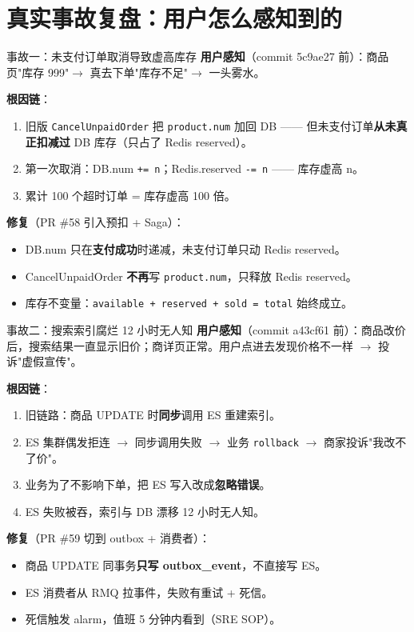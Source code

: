 \documentclass[aspectratio=169,11pt]{beamer}
\begin{document}
\section{真实事故复盘：用户怎么感知到的}

\begin{frame}[shrink]{事故一：未支付订单取消导致虚高库存}
\textbf{用户感知}（commit 5c9ae27 前）：商品页"库存 999"$\to$ 真去下单"库存不足"$\to$ 一头雾水。

\vspace{2mm}
\textbf{根因链}：
\begin{enumerate}
  \item 旧版 \texttt{CancelUnpaidOrder} 把 \texttt{product.num} 加回 DB —— 但未支付订单\textbf{从未真正扣减过} DB 库存（只占了 Redis reserved）。
  \item 第一次取消：DB.num \texttt{+= n}；Redis.reserved \texttt{-= n} —— 库存虚高 n。
  \item 累计 100 个超时订单 = 库存虚高 100 倍。
\end{enumerate}
\vspace{1mm}
\textbf{修复}（PR \#58 引入预扣 + Saga）：
\begin{itemize}
  \item DB.num 只在\textbf{支付成功}时递减，未支付订单只动 Redis reserved。
  \item CancelUnpaidOrder \textbf{不再}写 \texttt{product.num}，只释放 Redis reserved。
  \item 库存不变量：\texttt{available + reserved + sold = total} 始终成立。
\end{itemize}
\end{frame}

\begin{frame}[shrink]{事故二：搜索索引腐烂 12 小时无人知}
\textbf{用户感知}（commit a43cf61 前）：商品改价后，搜索结果一直显示旧价；商详页正常。用户点进去发现价格不一样 $\to$ 投诉"虚假宣传"。

\vspace{2mm}
\textbf{根因链}：
\begin{enumerate}
  \item 旧链路：商品 UPDATE 时\textbf{同步}调用 ES 重建索引。
  \item ES 集群偶发拒连 $\to$ 同步调用失败 $\to$ 业务 \texttt{rollback} $\to$ 商家投诉"我改不了价"。
  \item 业务为了不影响下单，把 ES 写入改成\textbf{忽略错误}。
  \item ES 失败被吞，索引与 DB 漂移 12 小时无人知。
\end{enumerate}
\vspace{1mm}
\textbf{修复}（PR \#59 切到 outbox + 消费者）：
\begin{itemize}
  \item 商品 UPDATE 同事务\textbf{只写 outbox\_event}，不直接写 ES。
  \item ES 消费者从 RMQ 拉事件，失败有重试 + 死信。
  \item 死信触发 alarm，值班 5 分钟内看到（SRE SOP）。
\end{itemize}
\end{frame}
\end{document}
